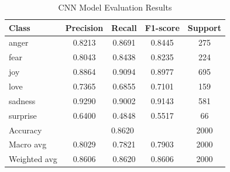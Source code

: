 \documentclass{article}
\begin{document}
\begin{table}[h]
\centering
\begin{tabular}{lcccc}
\hline
Class & Precision & Recall & F1-score & Support \\
\hline
anger    & 0.8213 & 0.8691 & 0.8445 & 275 \\
fear     & 0.8043 & 0.8438 & 0.8235 & 224 \\
joy      & 0.8864 & 0.9094 & 0.8977 & 695 \\
love     & 0.7365 & 0.6855 & 0.7101 & 159 \\
sadness  & 0.9290 & 0.9002 & 0.9143 & 581 \\
surprise & 0.6400 & 0.4848 & 0.5517 & 66 \\
\hline
Accuracy & \multicolumn{3}{c}{0.8620} & 2000 \\
Macro avg    & 0.8029 & 0.7821 & 0.7903 & 2000 \\
Weighted avg & 0.8606 & 0.8620 & 0.8606 & 2000 \\
\hline
\end{tabular}
\caption{CNN Model Evaluation Results}
\end{table}
\end{document}
